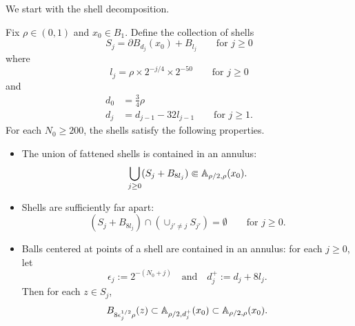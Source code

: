 \documentclass[12pt]{amsart}
\numberwithin{equation}{section}
\begin{document}
	
	
	
	We start with the shell decomposition. 
	\begin{lemma} \label{lemma:shell-decomposition}
		Fix $\rho \in (0,1)$ and $x_0 \in B_1$. Define the collection of shells
		\begin{equation}
		S_j =  \partial B_{d_j}(x_0) + B_{l_j}  \qquad \mbox{for $j \geq 0$}
		\end{equation}
		where 
		\begin{equation}
		l_j = \rho \times 2^{-j/4} \times 2^{-50} \qquad \mbox{for $j \geq 0$}
		\end{equation}
		and
		\begin{equation}
		\begin{aligned}
		d_0 &= \frac34 \rho  \\
		d_j &= d_{j-1} - 32   l_{j-1} \qquad \mbox{for $j \geq 1$}.
		\end{aligned}
		\end{equation}
		For each $N_0 \geq 200$, the shells satisfy the following properties.
		\begin{itemize}
			\item The union of fattened shells is contained in an annulus:
			\begin{equation} \label{eq:contained-in-annulus}
			\bigcup_{j \geq 0} (S_j + B_{8 l_j}) \Subset \mathbb{A}_{\rho/2, \rho}(x_0).
			\end{equation}
			\item Shells are sufficiently far apart:
			\begin{equation} \label{eq:sparse-shells}
			(S_j + B_{8 l_j}) \cap \left( \cup_{j' \neq j} S_{j'} \right) = \emptyset \qquad \mbox{for $j \geq 0$}.
			\end{equation}
			\item Balls centered at points of a shell are contained in an annulus: for each $j \geq 0$, let
			\begin{equation} \label{eq:def-epsilon-j}
			\epsilon_j := 2^{-(N_0 + j)} \quad \text{and} \quad d^+_j := d_j + 8 l_j .
			\end{equation} 
			Then for each $z\in S_j$, 
			\begin{equation} \label{eq:annulus-contained-in-ball}
			B_{8 \epsilon^{1/2}_j \rho}(z) \subset \mathbb{A}_{\rho/2, d^+_j}(x_0) \subset \mathbb{A}_{\rho/2, \rho}(x_0).
			\end{equation}
			
			
		\end{itemize}
		
	\end{lemma}
\end{document}
